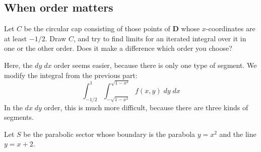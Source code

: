 \documentclass[]{exam}
\begin{document}
\begin{questions}
\subsection{When order matters}

\question Let $C$ be the circular cap consisting of those points of $\mathbf{D}$ whose $x$-coordinates are at least $-1/2$. Draw $C$, and try to find limits for an iterated integral over it in one or the other order. Does it make a difference which order you choose?

\begin{solution}
    Here, the $dy \; dx$ order seems easier, because there is only one type of segment. We modify the integral from the previous part:
    \begin{equation*}
        \int_{-1/2}^{1} \int_{-\sqrt{1-x^2}}^{\sqrt{1-x^2}} f(x,y) \; dy \; dx    
    \end{equation*}
    In the $dx \; dy$ order, this is much more difficult, because there are three kinds of segments.
\end{solution}

\question Let $S$ be the parabolic sector whose boundary is the parabola $y = x^2$ and the line $y = x + 2$. 


\end{questions}
\end{document}
